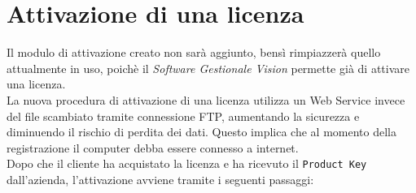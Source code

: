 \section{Attivazione di una licenza}
Il modulo di attivazione creato non sarà aggiunto, bensì rimpiazzerà quello attualmente in uso, poichè il \textit{Software Gestionale Vision} permette già di attivare una licenza.\\
La nuova procedura di attivazione di una licenza utilizza un Web Service invece del file scambiato tramite connessione FTP, aumentando la sicurezza e diminuendo il rischio di perdita dei dati. Questo implica che al momento della registrazione il computer debba essere connesso a internet.\\
Dopo che il cliente ha acquistato la licenza e ha ricevuto il \texttt{Product Key} dall'azienda, l'attivazione avviene tramite i seguenti passaggi:
